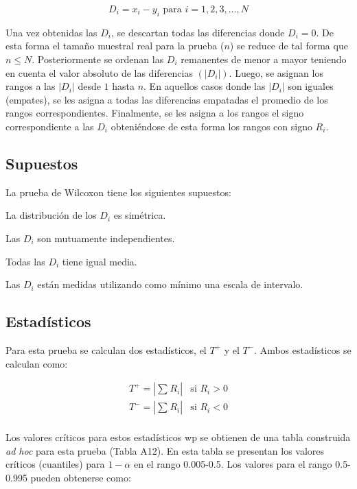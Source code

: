 \documentclass[]{book}
\theoremstyle{definition}
\theoremstyle{definition}
\theoremstyle{definition}
\theoremstyle{remark}
\begin{document}
\[
D_{i} = x_{i} - y_{i}\text{ para }i = 1, 2, 3,\ldots, N
\]

Una vez obtenidas las \(D_{i}\), se descartan todas las diferencias
donde \(D_{i} = 0\). De esta forma el tamaño muestral real para la
prueba (\(n\)) se reduce de tal forma que \(n \leq N\). Posteriormente
se ordenan las \(D_{i}\) remanentes de menor a mayor teniendo en cuenta
el valor absoluto de las diferencias \((\left| D_{i} \right|)\). Luego,
se asignan los rangos a las \(|D_{i}|\) desde \(1\) hasta \(n\). En
aquellos casos donde las \(|D_{i}|\) son iguales (empates), se les
asigna a todas las diferencias empatadas el promedio de los rangos
correspondientes. Finalmente, se les asigna a los rangos el signo
correspondiente a las \(D_{i}\) obteniéndose de esta forma los rangos
con signo \(R_{i}\).

\hypertarget{supuestos-1}{%
\subsection{Supuestos}\label{supuestos-1}}

La prueba de Wilcoxon tiene los siguientes supuestos:

La distribución de los \(D_{i}\) es simétrica.

Las \(D_{i}\) son mutuamente independientes.

Todas las \(D_{i}\) tiene igual media.

Las \(D_{i}\) están medidas utilizando como mínimo una escala de
intervalo.

\hypertarget{estadisticos-1}{%
\subsection{Estadísticos}\label{estadisticos-1}}

Para esta prueba se calculan dos estadísticos, el \(T^{+}\) y el
\(T^{-}\). Ambos estadísticos se calculan como:

\[
\begin{matrix}
T^{+} = \left| \sum_{}^{}R_{i} \right| & \text{si }R_{i} > 0 \\
T^{-} = \left| \sum_{}^{}R_{i} \right| & \text{si }R_{i} < 0 \\
\end{matrix}
\]

Los valores críticos para estos estadísticos wp se obtienen de una tabla
construida \emph{ad hoc} para esta prueba (Tabla A12). En esta tabla se
presentan los valores críticos (cuantiles) para \(1 - \alpha\) en el
rango 0.005-0.5. Los valores para el rango 0.5-0.995 pueden obtenerse
como:
\end{document}

